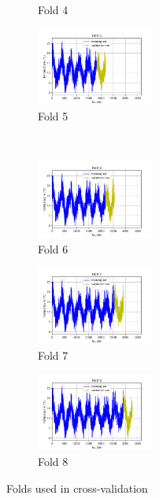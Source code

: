 \documentclass[a4paper]{article}
\begin{document}
\begin{figure}
\begin{subfigure}{0.32\textwidth}
        \caption{Fold 4}
        \label{fig:sub5}
    \end{subfigure}\hfill
    \begin{subfigure}{0.32\textwidth}
        \centering
        \includegraphics[width=3.85cm]{figure_6_fold_5}
        \caption{Fold 5}
        \label{fig:sub6}
    \end{subfigure}
    \\
    \begin{subfigure}{0.32\textwidth}
        \centering
        \includegraphics[width=3.85cm]{figure_7_fold_6}
        \caption{Fold 6}
        \label{fig:sub7}
    \end{subfigure}\hfill
    \begin{subfigure}{0.32\textwidth}
        \centering
        \includegraphics[width=3.85cm]{figure_8_fold_7}
        \caption{Fold 7}
        \label{fig:sub8}
    \end{subfigure}\hfill
    \begin{subfigure}{0.32\textwidth}
        \centering
        \includegraphics[width=3.85cm]{figure_9_fold_8}
        \caption{Fold 8}
        \label{fig:sub9}
    \end{subfigure}
    \caption{Folds used in cross-validation}
    \label{fig:pre-ex1-kfold}
\end{figure}
\end{document}
